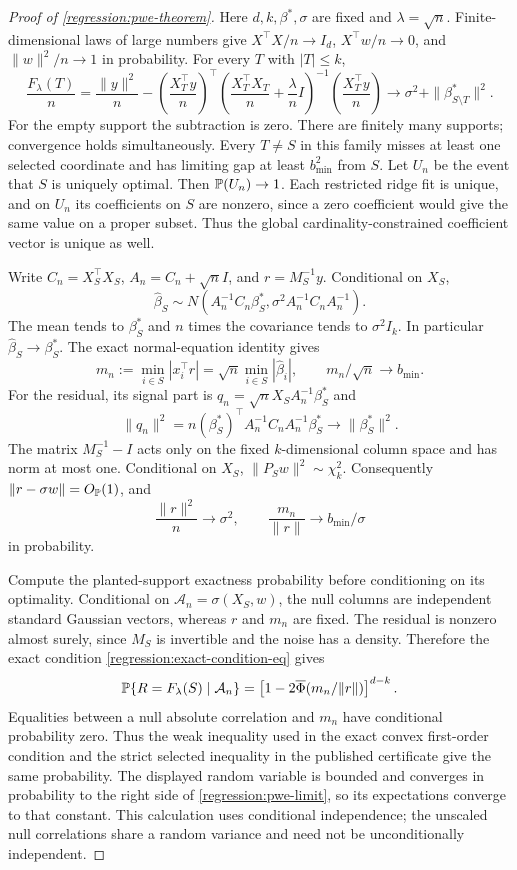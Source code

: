 \begin{proof}[Proof of \cref{regression:pwe-theorem}]
Here $d,k,\beta^*,\sigma$ are fixed and $\lambda=\sqrt n$.
Finite-dimensional laws of large numbers give
$X^\top X/n\to I_d$, $X^\top w/n\to0$, and $\|w\|^2/n\to1$
in probability. For every $T$ with $|T|\leq k$,
\[
 \frac{F_\lambda(T)}n=
 \frac{\|y\|^2}n-
 \left(\frac{X_T^\top y}n\right)^\top
 \left(\frac{X_T^\top X_T}n+\frac{\lambda}nI\right)^{-1}
 \left(\frac{X_T^\top y}n\right)
 \longrightarrow \sigma^2+\|\beta^*_{S\setminus T}\|^2.
\]
For the empty support the subtraction is zero.
There are finitely many supports; convergence holds simultaneously.
Every $T\ne S$ in this family misses at least one selected coordinate
and has limiting gap at least $b_{\min}^2$ from $S$.
Let $U_n$ be the event that $S$ is uniquely optimal.
Then $\mathbb{P}(U_n)\to1$. Each restricted ridge fit is unique, and on
$U_n$ its coefficients on $S$ are nonzero, since a zero coefficient
would give the same value on a proper subset. Thus the global
cardinality-constrained coefficient vector is unique as well.

Write $C_n=X_S^\top X_S$, $A_n=C_n+\sqrt nI$, and
$r=M_S^{-1}y$. Conditional on $X_S$,
\[
 \widehat\beta_S\sim
 N(A_n^{-1}C_n\beta_S^*,
       \sigma^2A_n^{-1}C_nA_n^{-1}).
\]
The mean tends to $\beta_S^*$ and $n$ times the covariance tends
to $\sigma^2I_k$. In particular $\widehat\beta_S\to\beta_S^*$.
The exact normal-equation identity gives
\[
 m_n:=\min_{i\in S}|x_i^\top r|
       =\sqrt n\min_{i\in S}|\widehat\beta_i|,
 \qquad m_n/\sqrt n\longrightarrow b_{\min}.
\]
For the residual, its signal part is
$q_n=\sqrt nX_SA_n^{-1}\beta_S^*$ and
\[
 \|q_n\|^2=n(\beta_S^*)^\top A_n^{-1}C_nA_n^{-1}\beta_S^*
                       \longrightarrow\|\beta_S^*\|^2.
\]
The matrix $M_S^{-1}-I$ acts only on the fixed $k$-dimensional
column space and has norm at most one.
Conditional on $X_S$, $\|P_Sw\|^2\sim\chi_k^2$.
Consequently $\|r-\sigma w\|=O_{\mathbb{P}}(1)$, and
\[
 \frac{\|r\|^2}n\longrightarrow\sigma^2,\qquad
 \frac{m_n}{\|r\|}\longrightarrow b_{\min}/\sigma
\]
in probability.

Compute the planted-support exactness probability before conditioning
on its optimality. Conditional on $\mathcal A_n=\sigma(X_S,w)$,
the null columns are independent standard Gaussian vectors, whereas
$r$ and $m_n$ are fixed. The residual is nonzero almost surely,
since $M_S$ is invertible and the noise has a density. Therefore
the exact condition \eqref{regression:exact-condition-eq} gives
\[
 \mathbb{P}\{R=F_\lambda(S)\mid\mathcal A_n\}
   =\left[1-2\overline\Phi(m_n/\|r\|)\right]^{d-k}.
\]
Equalities between a null absolute correlation and $m_n$ have
conditional probability zero. Thus the weak inequality used in
the exact convex first-order condition and the strict selected
inequality in the published certificate give the same probability.
The displayed random variable is bounded and converges in
probability to the right side of \eqref{regression:pwe-limit},
so its expectations converge to that constant.
This calculation uses conditional independence; the unscaled
null correlations share a random variance and need not be
unconditionally independent.


\end{proof}
